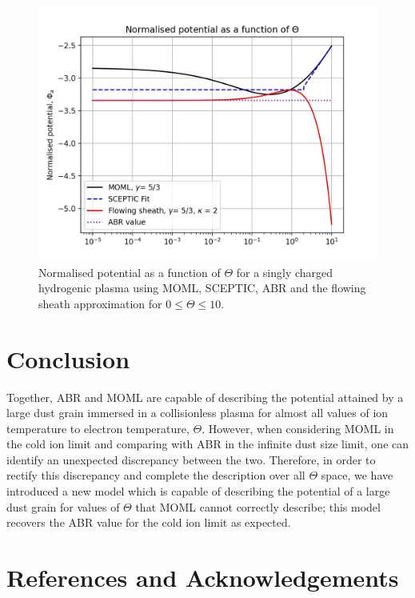 \documentclass{article}
\begin{document}
\begin{figure}[H]
\centering
\includegraphics[width=\linewidth]{Output/ModelComparions.jpeg}
\caption{Normalised potential as a function of $\Theta$ for a singly charged hydrogenic plasma using MOML, SCEPTIC,
ABR and the flowing sheath approximation for $0 \leq \Theta \leq 10$.}
\label{ModelComparions} 
\end{figure}

\section{Conclusion}

Together, ABR and MOML are capable of describing the 
potential attained by a large dust grain immersed in a collisionless plasma
for almost all values of ion temperature to electron temperature, $\Theta$. 
However, when considering MOML in the cold 
ion limit and comparing with ABR in the infinite dust size limit, one can identify an 
unexpected discrepancy between the two. Therefore, in order to rectify this 
discrepancy and complete the description over all $\Theta$ space, we have introduced a new model 
which is capable of describing the potential of a large dust grain for values 
of $\Theta$ that MOML cannot correctly describe; this model recovers 
the ABR value for the cold ion limit as expected.

\newpage

\section{References and Acknowledgements}


\end{document}
